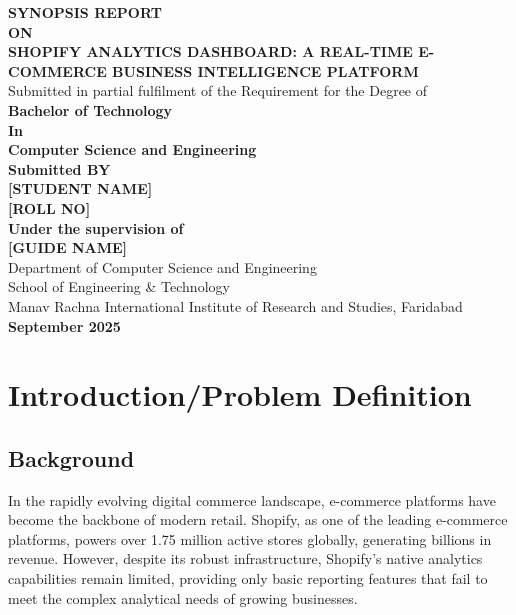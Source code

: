 \documentclass[12pt]{article}
\begin{document}
\begin{titlepage}
\centering
\vspace*{2cm}

{\Large \textbf{SYNOPSIS REPORT}}\\[0.5cm]
{\Large \textbf{ON}}\\[0.5cm]
{\Large \textbf{SHOPIFY ANALYTICS DASHBOARD: A REAL-TIME E-COMMERCE BUSINESS INTELLIGENCE PLATFORM}}\\[1cm]

{\large Submitted in partial fulfilment of the Requirement for the Degree of}\\[0.5cm]
{\large \textbf{Bachelor of Technology}}\\[0.2cm]
{\large \textbf{In}}\\[0.2cm]
{\large \textbf{Computer Science and Engineering}}\\[1cm]

{\large \textbf{Submitted BY}}\\[0.2cm]
{\large \textbf{[STUDENT NAME]}}\\[0.1cm]
{\large \textbf{[ROLL NO]}}\\[1cm]

{\large \textbf{Under the supervision of}}\\[0.2cm]
{\large \textbf{[GUIDE NAME]}}\\[1cm]

{\large Department of Computer Science and Engineering}\\[0.2cm]
{\large School of Engineering \& Technology}\\[0.2cm]
{\large Manav Rachna International Institute of Research and Studies, Faridabad}\\[0.5cm]
{\large \textbf{September 2025}}

\end{titlepage}

\tableofcontents
\newpage

\section{Introduction/Problem Definition}

\subsection{Background}
In the rapidly evolving digital commerce landscape, e-commerce platforms have become the backbone of modern retail. Shopify, as one of the leading e-commerce platforms, powers over 1.75 million active stores globally, generating billions in revenue. However, despite its robust infrastructure, Shopify's native analytics capabilities remain limited, providing only basic reporting features that fail to meet the complex analytical needs of growing businesses.
\end{document}
